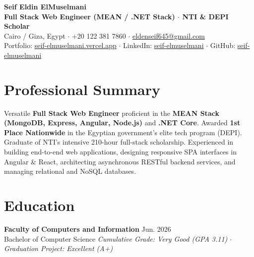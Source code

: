 \documentclass[11pt,a4paper]{article}
\begin{document}
\begin{center}
    {\huge \textbf{Seif Eldin ElMuselmani}} \\ \vspace{1.5mm}
    {\large \textbf{Full Stack Web Engineer (MEAN / .NET Stack) $\cdot$ NTI \& DEPI Scholar}} \\ \vspace{1mm}
    Cairo / Giza, Egypt $\cdot$ +20 122 381 7860 $\cdot$ \href{mailto:eldenseif645@gmail.com}{eldenseif645@gmail.com} \\
    Portfolio: \href{https://seif-elmuselmani.vercel.app}{seif-elmuselmani.vercel.app} $\cdot$ LinkedIn: \href{https://linkedin.com/in/seif-elmuselmani}{seif-elmuselmani} $\cdot$ GitHub: \href{https://github.com/seif-elmuselmani}{seif-elmuselmani}
\end{center}

\vspace{-2.5mm}
\section{Professional Summary}
Versatile \textbf{Full Stack Web Engineer} proficient in the \textbf{MEAN Stack (MongoDB, Express, Angular, Node.js)} and \textbf{.NET Core}. Awarded \textbf{1st Place Nationwide} in the Egyptian government's elite tech program (DEPI). Graduate of NTI's intensive 210-hour full-stack scholarship. Experienced in building end-to-end web applications, designing responsive SPA interfaces in Angular \& React, architecting asynchronous RESTful backend services, and managing relational and NoSQL databases.

\section{Education}
\textbf{Faculty of Computers and Information} \hfill Jun. 2026 \\
Bachelor of Computer Science \hfill \textit{Cumulative Grade: Very Good (GPA 3.11) $\cdot$ Graduation Project: Excellent (A+)}

\end{document}
